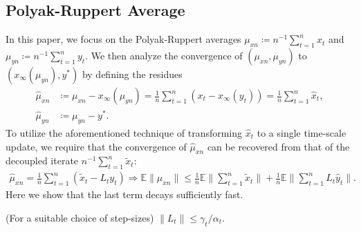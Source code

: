 \subsection{Polyak-Ruppert Average}
In this paper, we focus on the Polyak-Ruppert averages $\mu_{xn} \coloneqq n^{-1} \sum_{t=1}^n x_t$ and $\mu_{yn} \coloneqq n^{-1} \sum_{t=1}^n y_t$.
We then analyze the convergence of $(\mu_{xn}, \mu_{yn})$ to $(x_\infty (\mu_{yn}), y^*)$ by defining the residues
\begin{align*}
    \hat{\mu}_{xn} &\coloneqq \mu_{xn} - x_\infty (\mu_{yn}) = \frac{1}{n}\sum_{t=1}^n (x_t - x_\infty (y_t))  = \frac{1}{n}\sum_{t=1}^n \hat{x}_t, 
    \\
    \hat{\mu}_{yn} &\coloneqq \mu_{yn} - y^* .
\end{align*}
To utilize the aforementioned technique of transforming $\hat{x}_t$ to a single time-scale update, we require that the convergence of $\hat{\mu}_{xn}$ can be recovered from that of the decoupled iterate $n^{-1} \sum_{t=1}^n \tilde{x}_t$:
\begin{align*}
    \hat{\mu}_{xn} = \frac{1}{n}\sum_{t=1}^n (\tilde{x}_t - L_t y_t) 
    \Rightarrow 
    \mathbb{E} \lVert \hat{\mu}_{xn} \rVert 
        \leq 
    \frac{1}{n} \mathbb{E} \lVert \sum_{t=1}^n \tilde{x}_t \rVert
    + \frac{1}{n} \mathbb{E} \lVert \sum_{t=1}^n L_t \hat{y}_t \rVert .
\end{align*}
Here we show that the last term decays sufficiently fast.
\begin{lemma}\label{lem:Ltsize}
    {\color{red}(For a suitable choice of step-sizes) $\lVert L_t \rVert \leq \gamma_t / \alpha_t$.}
\end{lemma}
